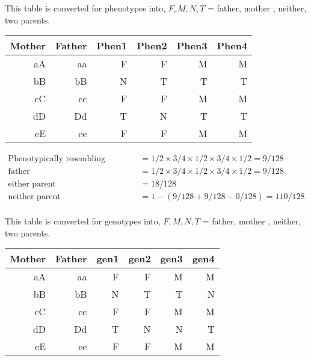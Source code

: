 \begin{enumerate}
	This table is converted for phenotypes into, $ F, M, N, T $ = father, mother , neither, two parents.
	
	\begin{table}[H]
		\centering
		\begin{tabular}{@{}rr|rrrr@{}}
			\toprule
			Mother & Father & Phen1 & Phen2 & Phen3 & Phen4 \\ \midrule
			aA     & aa		& F	 & F 	  & M 	   & M   \\
			bB     & bB     & N	 & T 	  & T 	   & T    \\
			cC     & cc     & F	 & F 	  & M 	   & M    \\
			dD     & Dd     & T	 & N 	  & T 	   & T    \\
			eE     & ee     & F	 & F 	  & M 	   & M    \\ \bottomrule
		\end{tabular}
	\end{table}
	
	\begin{subequations}
		\begin{align}
			\text{Phenotypically resembling mother} &=  1/2 \times 3/4 \times 1/2 \times 3/4 \times 1/2  = 9/128\\
			\text{father} &=  1/2 \times 3/4 \times 1/2 \times 3/4 \times 1/2  = 9/128\\
			\text{either parent} &=  18/128 \\
			\text{neither parent} &=  1 - (9 / 128 + 9 / 128 - 0/128) = 110/128
		\end{align}
	\end{subequations}\\
	This table is converted for genotypes into, $ F, M, N, T $ = father, mother , neither, two parents.
	
	\begin{table}[H]
		\centering
		\begin{tabular}{@{}rr|rrrr@{}}
			\toprule
			Mother & Father & gen1 & gen2 & gen3 & gen4 \\ \midrule
			aA     & aa		& F	 & F 	  & M 	   & M   \\
			bB     & bB     & N	 & T 	  & T 	   & N    \\
			cC     & cc     & F	 & F 	  & M 	   & M    \\
			dD     & Dd     & T	 & N 	  & N 	   & T    \\
			eE     & ee     & F	 & F 	  & M 	   & M    \\ \bottomrule
		\end{tabular}
	\end{table}
	

\end{enumerate}
